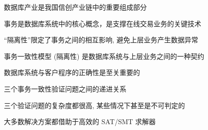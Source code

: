
\begin{frame}{}
	\begin{center}
		数据库产业是我国信创产业链中的重要组成部分

		\vspace{0.20cm}
	\end{center}
\end{frame}

\begin{frame}{}
	\begin{center}
		事务是数据库系统中的核心概念，是支撑在线交易业务的关键技术

		\vspace{0.30cm}
	\end{center}
\end{frame}

\begin{frame}{}
	\begin{center}
		``隔离性''限定了事务之间的相互影响, 避免上层业务产生数据异常

		\vspace{0.20cm}
	\end{center}
\end{frame}

\begin{frame}{}
	\begin{center}
		事务一致性模型 (隔离性) 是数据库系统与上层业务之间的一种契约

		\vspace{0.20cm}
	\end{center}
\end{frame}

\begin{frame}{}
	\begin{center}
		数据库系统与客户程序的正确性是至关重要的


		{\small 三个事务一致性验证问题之间的递进关系}
	\end{center}
\end{frame}

\begin{frame}{}
	\begin{center}
		三个验证问题的复杂度都很高, 某些情况下甚至是不可判定的

		\vspace{0.30cm}
		\vspace{0.30cm}

		大多数解决方案都借助于高效的 SAT/SMT 求解器
	\end{center}
\end{frame}

